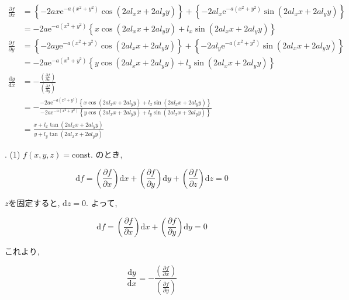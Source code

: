 \documentclass[dvipdfmx]{jsarticle}
\begin{document}
\begin{align*}
    \frac{\partial f}{\partial x} &= \left\{-2ax \mathrm{e}^{-a(x^2 + y^2)} \cos{(2 a l_x x + 2 a l_y y)} \right\} + \left\{-2a l_x \mathrm{e}^{-a(x^2 + y^2)} \sin{(2 a l_x x + 2 a l_y y)} \right\} \\
    &= -2a\mathrm{e}^{-a(x^2 + y^2)} \left\{x \cos{(2 a l_x x + 2 a l_y y)} + l_x \sin{(2 a l_x x + 2 a l_y y)} \right\} \\
    \frac{\partial f}{\partial y} &= \left\{-2ay \mathrm{e}^{-a(x^2 + y^2)} \cos{(2 a l_x x + 2 a l_y y)} \right\} + \left\{-2a l_y \mathrm{e}^{-a(x^2 + y^2)} \sin{(2 a l_x x + 2 a l_y y)} \right\} \\
    &= -2a\mathrm{e}^{-a(x^2 + y^2)} \left\{y \cos{(2 a l_x x + 2 a l_y y)} + l_y \sin{(2 a l_x x + 2 a l_y y)} \right\} \\
    \frac{\mathrm{d}y}{\mathrm{d}x} &= - \frac{\left(\frac{\partial{f}}{\partial{x}}\right)} {\left(\frac{\partial{f}}{\partial{y}}\right)} \\
    &= - \frac{-2a\mathrm{e}^{-a(x^2 + y^2)} \left\{x \cos{(2 a l_x x + 2 a l_y y)} + l_x \sin{(2 a l_x x + 2 a l_y y)} \right\}}{-2a\mathrm{e}^{-a(x^2 + y^2)} \left\{y \cos{(2 a l_x x + 2 a l_y y)} + l_y \sin{(2 a l_x x + 2 a l_y y)} \right\}} \\
    &= \frac{x + l_x \tan{(2 a l_x x + 2 a l_y y)}}{y + l_y \tan{(2 a l_x x + 2 a l_y y)}}
\end{align*}

. (1) $f(x, y, z) = \mathrm{const.}$ のとき, 

\begin{equation*}
    \mathrm{d}f = \left(\frac{\partial{f}}{\partial x}\right) \mathrm{d}x + \left(\frac{\partial{f}}{\partial y}\right) \mathrm{d}y + \left(\frac{\partial{f}}{\partial z}\right) \mathrm{d}z = 0
\end{equation*}

$z$を固定すると, $\mathrm{d}z = 0$. よって, 

\begin{equation*}
    \mathrm{d}f = \left(\frac{\partial{f}}{\partial x}\right) \mathrm{d}x + \left(\frac{\partial{f}}{\partial y}\right) \mathrm{d}y = 0
\end{equation*}

これより, 

\begin{equation*}
    \frac{\mathrm{d} y}{\mathrm{d} x} = - \frac{\left(\frac{\partial f}{\partial x}\right)}{\left(\frac{\partial f}{\partial y}\right)}
\end{equation*}
\end{document}
